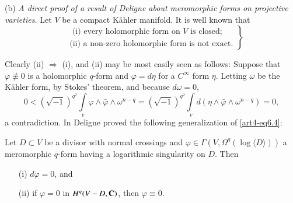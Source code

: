 (b) \textit{A direct proof of a result of Deligne about meromorphic forms on projective varieties.} Let $V$ be a compact K\"ahler manifold. It is well known that 
\begin{equation}
\left.
\begin{aligned}
 & \text{~(i) every holomorphic form on $V$ is closed;}\\
 & \text{(ii) a non-zero holomorphic form is not exact.} 
\end{aligned}
\right\}\label{art4-eq6.4}
\end{equation}

Clearly (ii) $\Rightarrow$ (i), and (ii) may be most easily seen as follows: Suppose that $\varphi \not\equiv 0$ is a holomorphic $q$-form and $\varphi = d \eta$ for a $C^\infty$ form $\eta$. Letting $\omega$ be the K\"ahler form, by Stokes' theorem, and because $d\omega = 0$,
$$
0 < (\sqrt{-1})^{q^2} \int\limits_v \varphi \wedge \bar{\varphi} \wedge \omega^{n-q} = (\sqrt{-1})^{q^2} \int\limits_v d (\eta \wedge \bar{\varphi} \wedge \omega^{n-q}) = 0,
$$
a contradiction. In \cite{art4-key13} Deligne proved the following generalization of \eqref{art4-eq6.4}:

\setcounter{proposition}{4}
\begin{proposition}\label{art4-eq6.5}
Let $D \subset V$ be a divisor with normal crossings and $\varphi \in \Gamma (V, \Omega^q (\log \langle D \rangle))$ a meromorphic $q$-form having a logarithmic singularity on $D$. Then
\begin{itemize}
\item[(i)] $d\varphi = 0$, and 

\item[(ii)] if $\varphi =0$ in $H^q (V - D, \mathbf{C})$, then $\varphi \equiv 0$.
\end{itemize}
\end{proposition}

